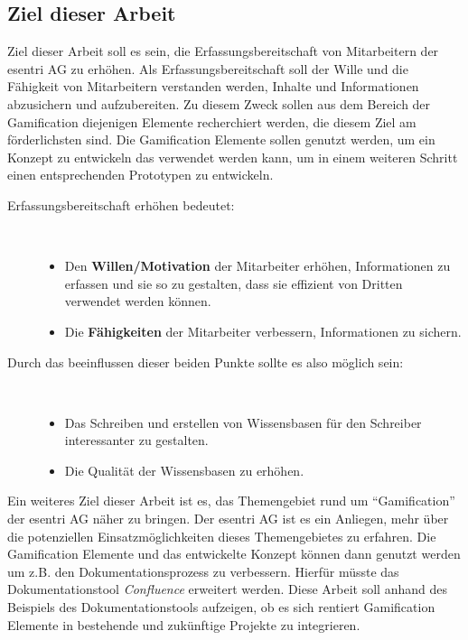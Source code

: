 \documentclass[a4paper,12pt]{scrartcl}
\begin{document}
\subsection{Ziel dieser Arbeit} 
Ziel dieser Arbeit soll es sein, die Erfassungsbereitschaft von Mitarbeitern der esentri AG zu erhöhen. Als Erfassungsbereitschaft soll der Wille und die Fähigkeit von Mitarbeitern verstanden werden, Inhalte und Informationen abzusichern und aufzubereiten. Zu diesem Zweck sollen aus dem Bereich der Gamification diejenigen Elemente recherchiert werden, die diesem Ziel am förderlichsten sind. Die Gamification Elemente sollen genutzt werden, um ein Konzept zu entwickeln das verwendet werden kann, um in einem weiteren Schritt einen entsprechenden Prototypen zu entwickeln.
\begin{description}
   \item[Erfassungsbereitschaft erhöhen bedeutet:]~\par
   \begin{itemize}
      \item Den \textbf{Willen/Motivation} der Mitarbeiter erhöhen, Informationen zu erfassen und sie so zu gestalten, dass sie effizient von Dritten verwendet werden können.  
      \item Die \textbf{Fähigkeiten} der Mitarbeiter verbessern, Informationen zu sichern.
   \end{itemize}
\end{description}

\begin{description}
   \item[Durch das beeinflussen dieser beiden Punkte sollte es also möglich sein:]~\par
   \begin{itemize}
      \item Das Schreiben und erstellen von Wissensbasen für den Schreiber interessanter zu gestalten.  
      \item Die Qualität der Wissensbasen zu erhöhen.
   \end{itemize}
\end{description}
Ein weiteres Ziel dieser Arbeit ist es, das Themengebiet rund um \enquote{Gamification} der esentri AG näher zu bringen. Der esentri AG ist es ein Anliegen, mehr über die potenziellen Einsatzmöglichkeiten dieses Themengebietes zu erfahren. Die Gamification Elemente und das entwickelte Konzept können dann genutzt werden um z.B. den Dokumentationsprozess zu verbessern. Hierfür müsste das Dokumentationstool \textit{Confluence} erweitert werden. Diese Arbeit soll anhand des Beispiels des Dokumentationstools aufzeigen, ob es sich rentiert Gamification Elemente in bestehende und zukünftige Projekte zu integrieren.  
\end{document}
